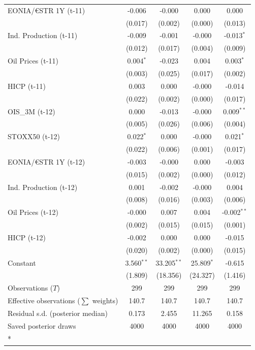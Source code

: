 \begin{longtable}[t]{lcccc}
EONIA/€STR 1Y (t-11) & -0.006 & -0.000 & 0.000 & 0.000\\
 & (0.017) & (0.002) & (0.000) & (0.013)\\
Ind. Production (t-11) & -0.009 & -0.001 & -0.000 & -0.013$^{*}$\\
 & (0.012) & (0.017) & (0.004) & (0.009)\\
Oil Prices (t-11) & 0.004$^{*}$ & -0.023 & 0.004 & 0.003$^{*}$\\
 & (0.003) & (0.025) & (0.017) & (0.002)\\
HICP (t-11) & 0.003 & 0.000 & -0.000 & -0.014\\
 & (0.022) & (0.002) & (0.000) & (0.017)\\
OIS\_3M (t-12) & 0.000 & -0.013 & -0.000 & 0.009$^{**}$\\
 & (0.005) & (0.026) & (0.006) & (0.004)\\
STOXX50 (t-12) & 0.022$^{*}$ & 0.000 & -0.000 & 0.021$^{*}$\\
 & (0.022) & (0.006) & (0.001) & (0.017)\\
EONIA/€STR 1Y (t-12) & -0.003 & -0.000 & 0.000 & -0.003\\
 & (0.015) & (0.002) & (0.000) & (0.012)\\
Ind. Production (t-12) & 0.001 & -0.002 & -0.000 & 0.004\\
 & (0.008) & (0.016) & (0.003) & (0.006)\\
Oil Prices (t-12) & -0.000 & 0.007 & 0.004 & -0.002$^{**}$\\
 & (0.002) & (0.015) & (0.015) & (0.001)\\
HICP (t-12) & -0.002 & 0.000 & 0.000 & -0.015\\
 & (0.020) & (0.002) & (0.000) & (0.015)\\
Constant & 3.560$^{**}$ & 33.205$^{**}$ & 25.809$^{*}$ & -0.615\\
 & (1.809) & (18.356) & (24.327) & (1.416)\\
\midrule
Observations ($T$) & 299 & 299 & 299 & 299\\
Effective observations ($\sum$ weights) & 140.7 & 140.7 & 140.7 & 140.7\\
Residual s.d. (posterior median) & 0.173 & 2.455 & 11.265 & 0.158\\
Saved posterior draws & 4000 & 4000 & 4000 & 4000\\*
\end{longtable}
\endgroup{}

\begingroup\fontsize{7}{9}\selectfont

